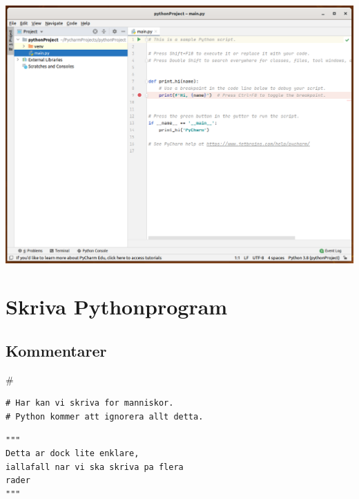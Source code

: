 \begin{frame}
  \centering
  \includegraphics[height=\textheight]{figs/pycharm.png}
\end{frame}


\section{Skriva Pythonprogram}

\subsection{Kommentarer}

\begin{frame}
  \begin{center}
    \huge\#
  \end{center}
\end{frame}

\begin{frame}[fragile]
  \begin{example}
    \begin{verbatim}
# Har kan vi skriva for manniskor.
# Python kommer att ignorera allt detta.
    \end{verbatim}
  \end{example}
\end{frame}

\begin{frame}[fragile]
  \begin{example}
    \begin{verbatim}
"""
Detta ar dock lite enklare,
iallafall nar vi ska skriva pa flera
rader
"""
    \end{verbatim}
  \end{example}
\end{frame}



